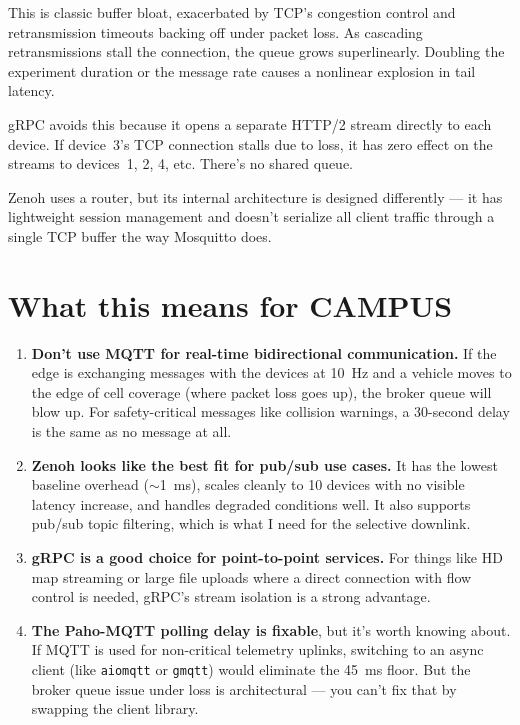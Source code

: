 \documentclass[11pt,a4paper]{article}
\begin{document}
This is classic buffer bloat, exacerbated by TCP's congestion control and retransmission timeouts backing off under packet loss. As cascading retransmissions stall the connection, the queue grows superlinearly. Doubling the experiment duration or the message rate causes a nonlinear explosion in tail latency.

gRPC avoids this because it opens a separate HTTP/2 stream directly to each device. If device~3's TCP connection stalls due to loss, it has zero effect on the streams to devices~1, 2, 4, etc. There's no shared queue.

Zenoh uses a router, but its internal architecture is designed differently --- it has lightweight session management and doesn't serialize all client traffic through a single TCP buffer the way Mosquitto does.

\section{What this means for CAMPUS}

\begin{enumerate}
    \item \textbf{Don't use MQTT for real-time bidirectional communication.} If the edge is exchanging messages with the devices at 10~Hz and a vehicle moves to the edge of cell coverage (where packet loss goes up), the broker queue will blow up. For safety-critical messages like collision warnings, a 30-second delay is the same as no message at all.

    \item \textbf{Zenoh looks like the best fit for pub/sub use cases.} It has the lowest baseline overhead ($\sim$1~ms), scales cleanly to 10 devices with no visible latency increase, and handles degraded conditions well. It also supports pub/sub topic filtering, which is what I need for the selective downlink.

    \item \textbf{gRPC is a good choice for point-to-point services.} For things like HD map streaming or large file uploads where a direct connection with flow control is needed, gRPC's stream isolation is a strong advantage.

    \item \textbf{The Paho-MQTT polling delay is fixable}, but it's worth knowing about. If MQTT is used for non-critical telemetry uplinks, switching to an async client (like \texttt{aiomqtt} or \texttt{gmqtt}) would eliminate the 45~ms floor. But the broker queue issue under loss is architectural --- you can't fix that by swapping the client library.
\end{enumerate}
\end{document}
